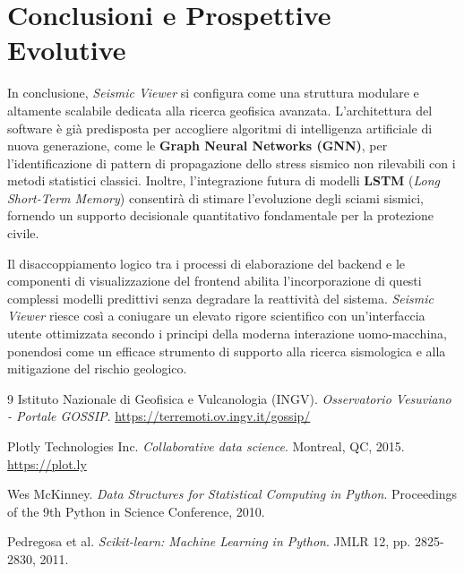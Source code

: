 \documentclass[12pt,a4paper]{article}
\begin{document}
\section{Conclusioni e Prospettive Evolutive}
In conclusione, \textit{Seismic Viewer} si configura come una struttura modulare e altamente scalabile dedicata alla ricerca geofisica avanzata. L'architettura del software è già predisposta per accogliere algoritmi di intelligenza artificiale di nuova generazione, come le \textbf{Graph Neural Networks (GNN)}, per l'identificazione di pattern di propagazione dello stress sismico non rilevabili con i metodi statistici classici. Inoltre, l'integrazione futura di modelli \textbf{LSTM} (\textit{Long Short-Term Memory}) consentirà di stimare l'evoluzione degli sciami sismici, fornendo un supporto decisionale quantitativo fondamentale per la protezione civile.

Il disaccoppiamento logico tra i processi di elaborazione del backend e le componenti di visualizzazione del frontend abilita l'incorporazione di questi complessi modelli predittivi senza degradare la reattività del sistema. \textit{Seismic Viewer} riesce così a coniugare un elevato rigore scientifico con un'interfaccia utente ottimizzata secondo i principi della moderna interazione uomo-macchina, ponendosi come un efficace strumento di supporto alla ricerca sismologica e alla mitigazione del rischio geologico.

\begin{thebibliography}{9}
Istituto Nazionale di Geofisica e Vulcanologia (INGV). 
\textit{Osservatorio Vesuviano - Portale GOSSIP}. 
\url{https://terremoti.ov.ingv.it/gossip/}

Plotly Technologies Inc. 
\textit{Collaborative data science}. 
Montreal, QC, 2015. \url{https://plot.ly}

Wes McKinney. 
\textit{Data Structures for Statistical Computing in Python}. 
Proceedings of the 9th Python in Science Conference, 2010.

Pedregosa et al. 
\textit{Scikit-learn: Machine Learning in Python}. 
JMLR 12, pp. 2825-2830, 2011.
\end{thebibliography}
\end{document}

